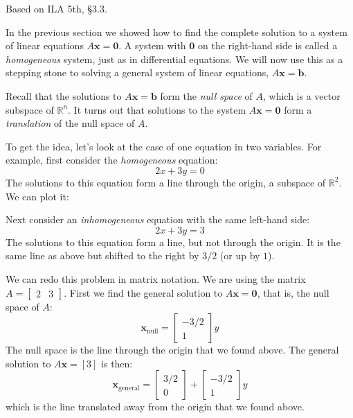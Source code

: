 \documentclass[11pt,oneside]{amsbook}
\newcommand{\R}{\mathbb R}
\theoremstyle{definition}
\theoremstyle{plain}
\theoremstyle{definition}
\theoremstyle{remark}
\numberwithin{equation}{section}
\numberwithin{figure}{section}
\begin{document}
Based on ILA 5th, \S 3.3.

In the previous section we showed how to find the complete solution to a system of linear equations $A\mathbf{x}=\mathbf{0}$. A system with $\mathbf{0}$ on the right-hand side is called a \emph{homogeneous} system, just as in differential equations. We will now use this as a stepping stone to solving a general system of linear equations, $A\mathbf{x}=\mathbf{b}$.

Recall that the solutions to $A\mathbf{x}=\mathbf{b}$ form the \emph{null space} of $A$, which is a vector subspace of $\R^n$. It turns out that solutions to the system $A\mathbf{x}=\mathbf{0}$ form a \emph{translation} of the null space of $A$.

To get the idea, let's look at the case of one equation in two variables. For example, first consider the \emph{homogeneous} equation:
\[2x+3y=0
\]
The solutions to this equation form a line through the origin, a subspace of $\R^2$. We can plot it:

\begin{center}
\end{center}

Next consider an \emph{inhomogeneous} equation with the same left-hand side:
\[2x+3y=3
\]
The solutions to this equation form a line, but not through the origin. It is the same line as above but shifted to the right by $3/2$ (or up by $1$).

\begin{center}
\end{center}

We can redo this problem in matrix notation. We are using the matrix $A=\begin{bmatrix}2&3\end{bmatrix}$. First we find the general solution to $A\mathbf{x}=\mathbf{0}$, that is, the null space of $A$:
\[\mathbf{x}_{\mathrm{null}}
  =\begin{bmatrix}-3/2\\1\end{bmatrix}y
\]
The null space is the line through the origin that we found above. The general solution to $A\mathbf{x}=[3]$ is then:
\[\mathbf{x}_{\mathrm{general}}
  =\begin{bmatrix}3/2\\0\end{bmatrix}
  +\begin{bmatrix}-3/2\\1\end{bmatrix}y
\]
which is the line translated away from the origin that we found above.
\end{document}
